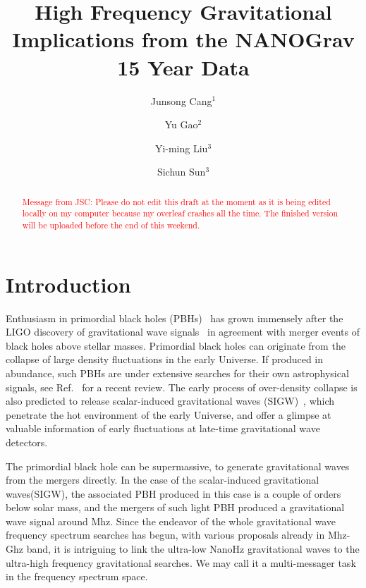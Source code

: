 \documentclass[aps, 10pt, preprintnumbers,prd, amsmath,amssymb,twocolumn,notitlepage]{revtex4} %
\newcommand{\ckk}[1]{\textcolor{red}{#1}}
\begin{document}
\title{High Frequency Gravitational Implications from the NANOGrav 15 Year Data}
\author{Junsong Cang$^{1}$}
\author{Yu Gao$^{2}$}
\author{Yi-ming Liu$^{3}$}
\author{Sichun Sun$^{3}$}




\begin{abstract}
\ckk{Message from JSC:
Please do not edit this draft at the moment as it is being edited locally on my computer because my overleaf crashes all the time.
The finished version will be uploaded before the end of this weekend.
}
\end{abstract}

\maketitle

\section{Introduction}

Enthusiasm in primordial black holes (PBHs)~\cite{Zeldovich:1967lct,Carr:1974nx} has grown immensely after the LIGO discovery of gravitational wave signals~\cite{} in agreement with merger events of black holes above stellar masses. Primordial black holes can originate from the collapse of large density fluctuations in the early Universe. If produced in abundance, such PBHs are under extensive searches for their own astrophysical signals, see Ref.~\cite{Carr:2021bzv} for a recent review. The early process of over-density collapse is also predicted to release scalar-induced gravitational waves (SIGW)~\cite{}, which penetrate the hot environment of the early Universe, and offer a glimpse at valuable information of early fluctuations at late-time gravitational wave detectors.

{\color{blue}
The primordial black hole can be supermassive, to generate gravitational waves from the mergers directly. In the case of the scalar-induced gravitational waves(SIGW), the associated PBH produced in this case is a couple of orders below solar mass, and the mergers of such light PBH produced a gravitational wave signal around Mhz. Since the endeavor of the whole gravitational wave frequency spectrum searches has begun, with various proposals already in Mhz-Ghz band\cite{}, it is intriguing to link the ultra-low NanoHz gravitational waves to the ultra-high frequency gravitational searches. We may call it a multi-messager task in the frequency spectrum space.
}
\end{document}
